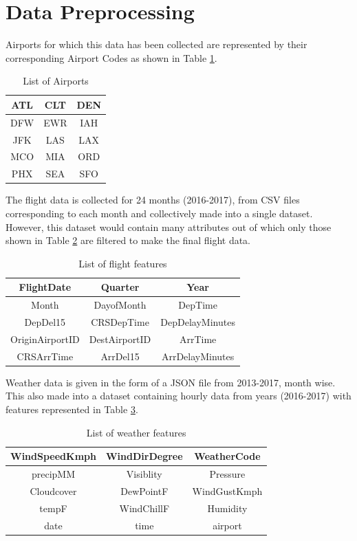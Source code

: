 \documentclass[12pt]{article}
\begin{document}
\section{Data Preprocessing}
Airports for which this data has been collected are represented by their corresponding Airport Codes as shown in Table \ref{Table:1}.
\begin{table}[H]
\begin{center}
\begin{tabular}{ |c|c|c| } 
\hline
 ATL & CLT & DEN \\ 
\hline
 DFW & EWR & IAH \\
\hline
 JFK & LAS & LAX \\
\hline
 MCO & MIA & ORD \\
\hline
 PHX & SEA & SFO \\ 
\hline
\end{tabular}
\caption{List of Airports}
\label{Table:1}
\end{center}
\end{table}
The flight data is collected for 24 months (2016-2017), from CSV files corresponding to each month and collectively made into a single dataset.  However, this dataset would contain many attributes out of which only those shown in Table \ref{Table:2} are filtered to make the final flight data.
\begin{table}[H]
\begin{center}
\begin{tabular}{ |c|c|c| } 
\hline
 FlightDate & Quarter & Year \\ 
 \hline
 Month & DayofMonth & DepTime \\
 \hline
 DepDel15 & CRSDepTime & DepDelayMinutes \\
 \hline
 OriginAirportID & DestAirportID & ArrTime \\
 \hline
 CRSArrTime & ArrDel15 & ArrDelayMinutes \\ 
 \hline
\end{tabular}
\caption{List of flight features}
\label{Table:2}
\end{center}
\end{table}
Weather data is given in the form of a JSON file from 2013-2017, month wise. This also made into a dataset containing hourly data from years (2016-2017) with features represented in Table \ref{Table:3}.
\begin{table}[H]
\begin{center}
\begin{tabular}{ |c|c|c| } 
 \hline
 WindSpeedKmph & WindDirDegree & WeatherCode \\ 
 \hline
 precipMM & Visiblity & Pressure \\
 \hline
 Cloudcover & DewPointF & WindGustKmph \\
 \hline
 tempF & WindChillF & Humidity \\
 \hline
 date & time & airport \\
 \hline
\end{tabular}
\caption{List of weather features}
\label{Table:3}
\end{center}
\end{table}
\end{document}
